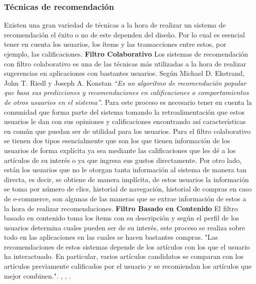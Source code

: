 \documentclass[12pt,letterpaper,openany]{book}
\begin{document}
\subsubsection{Técnicas de recomendación}
Existen una gran variedad de técnicas a la hora de realizar un sistema de recomendación el éxito o no de este dependen del diseño. Por lo cual es esencial tener en cuenta los usuarios, los ítems y las transacciones entre estos, por ejemplo, las calificaciones\cite{13}.
\vspace{5mm}\newline
\textbf{Filtro Colaborativo}\newline
Los sistemas de recomendación con filtro colaborativo es una de las técnicas más utilizadas a la hora de realizar sugerencias en aplicaciones con bastantes usuarios. Según Michael D. Ekstrand, John T. Riedl y Joseph A. Konstan \textit{``Es un algoritmo de recomendación popular que basa sus predicciones y recomendaciones en calificaciones o comportamientos de otros usuarios en el sistema''}\cite{14}. Para este proceso es necesario tener en cuenta la comunidad que forma parte del sistema tomando la retroalimentación que estos usuarios le dan con sus opiniones y calificaciones encontrando así características en común que puedan ser de utilidad para los usuarios\cite{15}.
Para el filtro colaborativo se tienen dos tipos esencialmente que son los que tienen información de los usuarios de forma explícita ya sea mediante las calificaciones que les dé a los artículos de su interés o ya que ingresa sus gustos directamente. Por otro lado, están los usuarios que no le otorgan tanta información al sistema de manera tan directa, es decir, se obtiene de manera implícita, de estos usuarios la información se toma por número de clics, historial de navegación, historial de compras en caso de e-commerce, son algunas de las maneras que se extrae información de estos a la hora de realizar recomendaciones\cite{13}.
\vspace{5mm}\newline
\textbf{Filtro Basado en Contenido}\newline
El filtro basado en contenido toma los ítems con su descripción y según el perfil de los usuarios determina cuales pueden ser de su interés, este proceso se realiza sobre todo en las aplicaciones en las cuales se hacen bastantes compras. "Las recomendaciones de estos sistemas depende de los artículos con los que el usuario ha interactuado. En particular, varios artículos candidatos se comparan con los artículos previamente calificados por el usuario y se recomiendan los artículos que mejor combinen.". \cite{13}, \cite{16}, \cite{17}.
\end{document}
